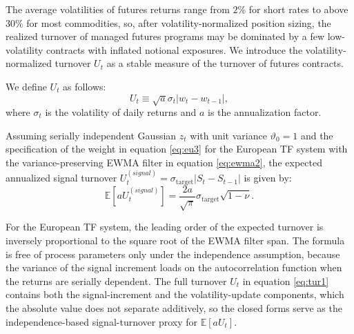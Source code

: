 \documentclass[hidelinks]{siamonline250211}
\begin{document}
The average volatilities of futures returns range from $2\%$ for short rates to above $30\%$ for most commodities, so, after volatility-normalized position sizing, the realized turnover of managed futures programs may be dominated by a few low-volatility contracts with inflated notional exposures. We introduce the volatility-normalized turnover $U_{t}$ as a stable measure of the turnover of futures contracts.


\begin{definition} We define $U_{t}$ as follows:
	\begin{equation} \label{eq:tur1}  
		U_{t}  \equiv \sqrt{a}\sigma_{t}\left| w_{t} -  w_{t-1}\right|,
	\end{equation}
	where $\sigma_{t}$ is the volatility of daily returns and $a$ is the annualization factor.
\end{definition}



\begin{proposition}\label{pr:turnover1} Assuming serially independent Gaussian $z_{t}$ with unit variance $\vartheta_{0}=1$ and the specification of the weight in equation \eqref{eq:eu3} for the European TF system with the variance-preserving EWMA filter in equation \eqref{eq:ewma2}, the expected annualized signal turnover $U^{(signal)}_{t} = \sigma_{\mathrm{target}}\left|S_{t}-S_{t-1}\right|$ is given by:
	\begin{equation} \label{eq:tur2} 
		\mathbb{E}\left[ a U^{(signal)}_{t} \right]    =  \frac{2a}{\sqrt{\pi}}\sigma_{\mathrm{target}} \sqrt{1-\nu}.
	\end{equation}
\end{proposition}



For the European TF system, the leading order of the expected turnover is inversely proportional to the square root of the EWMA filter span. The formula is free of process parameters only under the independence assumption, because the variance of the signal increment loads on the autocorrelation function when the returns are serially dependent. The full turnover $U_{t}$ in equation \eqref{eq:tur1} contains both the signal-increment and the volatility-update components, which the absolute value does not separate additively, so the closed forms serve as the independence-based signal-turnover proxy for $\mathbb{E}[aU_{t}]$.
\end{document}
